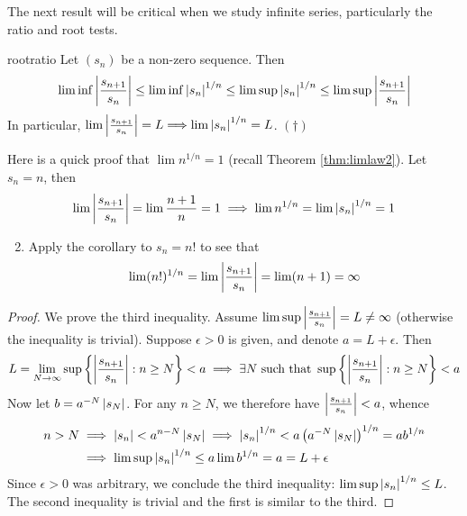 The next result will be critical when we study infinite series, particularly the ratio and root tests.

\begin{thm}{}{rootratio}
	Let $(s_n)$ be a non-zero sequence. Then
	\[
		\liminf\left| \frac{s_{n+1}}{s_n}\right|
		\le\liminf\left| s_n\right|^{1/n}
		\le\limsup\left| s_n\right|^{1/n}
		\le\limsup\left| \frac{s_{n+1}}{s_n}\right|
	\]
	In particular, $\lim\left| \frac{s_{n+1}}{s_n}\right|=L\Longrightarrow \lim\left| s_n\right|^{1/n}=L$. \hfill$(\dag)$
\end{thm}


\begin{examples}{}{}
	\exstart Here is a quick proof that $\lim n^{1/n}=1$ (recall Theorem \ref{thm:limlaw2}). Let $s_n=n$, then
  \[
  	\lim\left| \frac{s_{n+1}}{s_n}\right|=\lim\frac{n+1}n=1\implies \lim n^{1/n}=\lim\left| s_n\right|^{1/n}=1
  \]
\begin{enumerate}\setcounter{enumi}{1}
  \item Apply the corollary to $s_n=n!$ to see that
  \[
  	\lim(n!)^{1/n} 
  	=\lim\left| \frac{s_{n+1}}{s_n}\right| 
  	=\lim(n+1)=\infty
  \]
\end{enumerate}


\begin{proof}
	We prove the third inequality. Assume $\limsup\left| \frac{s_{n+1}}{s_n}\right|=L\neq \infty$ (otherwise the inequality is trivial). Suppose $\epsilon>0$ is given, and denote $a=L+\epsilon$. Then
	\[
		L=\lim_{N\to\infty} \sup\left\{\left| \frac{s_{n+1}}{s_n}\right|:n\ge N\right\}
		<a\implies
		\exists N\text{ such that }
		\sup\left\{\left| \frac{s_{n+1}}{s_n}\right|:n\ge N\right\}<a
	\]
	Now let $b=a^{-N}\left| s_{N}\right|$. For any $n\ge N$, we therefore have $\left| \frac{s_{n+1}}{s_n}\right|<a$, whence
	\begin{align*}
		n>N&\implies \left| s_n\right|< a^{n-N}\left| s_{N}\right| \implies \left| s_n\right|^{1/n}< a\left(a^{-N}\left| s_{N}\right|\right)^{1/n} =ab^{1/n}\\
		&\implies \limsup\left| s_n\right|^{1/n}\le a\lim b^{1/n}=a=L+\epsilon
	\end{align*}
	Since $\epsilon>0$ was arbitrary, we conclude the third inequality: $\limsup\left| s_n\right|^{1/n}\le L$.\smallbreak
	The second inequality is trivial and the first is similar to the third.
\end{proof}
\end{examples}


